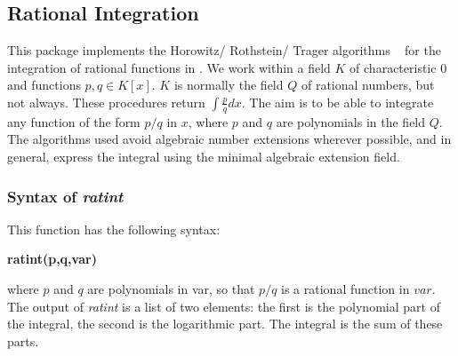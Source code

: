 
\subsection{Rational Integration}

This package implements the Horowitz/ Rothstein/ Trager algorithms ~\cite{Geddes:92} for the integration of rational functions in \REDUCE. We work within a field $K$ of characteristic $0$ and functions $p,q \in K[x]$. $K$ is normally the field $Q$ of rational numbers, but not always. These procedures return $\int \frac{p}{q} dx.$
 The aim is to be able to integrate any function of the form $p/q$ in $x$, where $p$ and $q$ are polynomials in the field $Q$. The algorithms used avoid algebraic number extensions wherever possible, and in general, express the integral using the minimal algebraic extension field.

\subsubsection{Syntax of \emph{ratint}}
This function has the following syntax:
\begin{center} \textbf{ratint(p,q,var)} \end{center}
where $p$ and $q$ are polynomials in var, so that $p/q$ is a rational function in $var$.
The output of \emph{ratint} is a list of two elements: the first is the polynomial part of the integral, the second is the logarithmic part. The integral is the sum of these parts.
